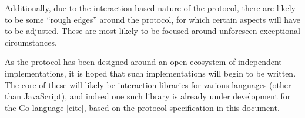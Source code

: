 
Additionally, due to the interaction-based nature of the protocol, there are likely to be some \enquote{rough edges} around the protocol, for which certain aspects will have to be adjusted. These are most likely to be focused around unforeseen exceptional circumstances.

As the protocol has been designed around an open ecosystem of independent implementations, it is hoped that such implementations will begin to be written. The core of these will likely be interaction libraries for various languages (other than JavaScript), and indeed one such library is already under development for the Go language [cite], based on the protocol specification in this document.
